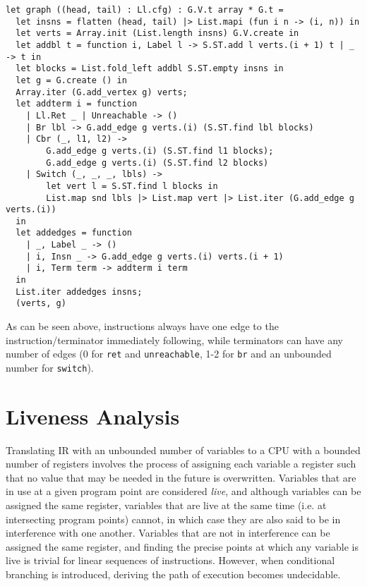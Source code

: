 \documentclass{article}
\begin{document}
\begin{verbatim}
let graph ((head, tail) : Ll.cfg) : G.V.t array * G.t =
  let insns = flatten (head, tail) |> List.mapi (fun i n -> (i, n)) in
  let verts = Array.init (List.length insns) G.V.create in
  let addbl t = function i, Label l -> S.ST.add l verts.(i + 1) t | _ -> t in
  let blocks = List.fold_left addbl S.ST.empty insns in
  let g = G.create () in
  Array.iter (G.add_vertex g) verts;
  let addterm i = function
    | Ll.Ret _ | Unreachable -> ()
    | Br lbl -> G.add_edge g verts.(i) (S.ST.find lbl blocks)
    | Cbr (_, l1, l2) ->
        G.add_edge g verts.(i) (S.ST.find l1 blocks);
        G.add_edge g verts.(i) (S.ST.find l2 blocks)
    | Switch (_, _, _, lbls) ->
        let vert l = S.ST.find l blocks in
        List.map snd lbls |> List.map vert |> List.iter (G.add_edge g verts.(i))
  in
  let addedges = function
    | _, Label _ -> ()
    | i, Insn _ -> G.add_edge g verts.(i) verts.(i + 1)
    | i, Term term -> addterm i term
  in
  List.iter addedges insns;
  (verts, g)
\end{verbatim}

\noindent As can be seen above, instructions always have one edge to the instruction/terminator immediately following, while terminators can have any number of edges (0 for \texttt{ret} and \texttt{unreachable}, 1-2 for \texttt{br} and an unbounded number for \texttt{switch}).



\section{Liveness Analysis}

%

Translating IR with an unbounded number of variables to a CPU with a bounded number of registers involves the process of assigning each variable a register such that no value that may be needed in the future is overwritten. %
Variables that are in use at a given program point are considered \textit{live}, and although variables can be assigned the same register, %
variables that are live at the same time (i.e. at intersecting program points) cannot, %
in which case they are also said to be in interference with one another.
 Variables that are not in interference can be assigned the same register, and finding the precise points at which any variable is live is trivial for linear sequences of instructions. However, when conditional branching is introduced, deriving the path of execution becomes undecidable. %
\end{document}
